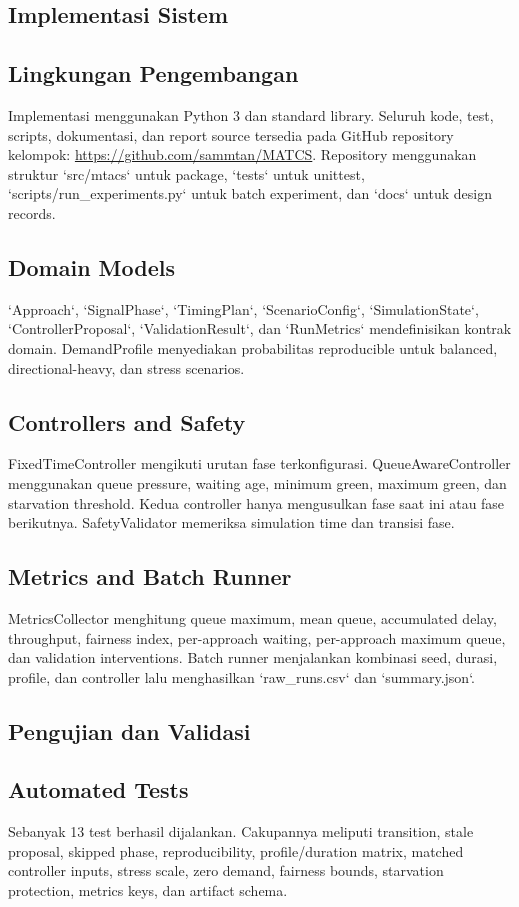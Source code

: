 \documentclass[12pt]{article}
\begin{document}
\subsection{Implementasi Sistem}
\subsection{Lingkungan Pengembangan}
Implementasi menggunakan Python 3 dan standard library. Seluruh kode, test, scripts, dokumentasi, dan report source tersedia pada GitHub repository kelompok: \url{https://github.com/sammtan/MATCS}. Repository menggunakan struktur `src/mtacs` untuk package, `tests` untuk unittest, `scripts/run\_experiments.py` untuk batch experiment, dan `docs` untuk design records.

\subsection{Domain Models}
`Approach`, `SignalPhase`, `TimingPlan`, `ScenarioConfig`, `SimulationState`, `ControllerProposal`, `ValidationResult`, dan `RunMetrics` mendefinisikan kontrak domain. DemandProfile menyediakan probabilitas reproducible untuk balanced, directional-heavy, dan stress scenarios.

\subsection{Controllers and Safety}
FixedTimeController mengikuti urutan fase terkonfigurasi. QueueAwareController menggunakan queue pressure, waiting age, minimum green, maximum green, dan starvation threshold. Kedua controller hanya mengusulkan fase saat ini atau fase berikutnya. SafetyValidator memeriksa simulation time dan transisi fase.

\subsection{Metrics and Batch Runner}
MetricsCollector menghitung queue maximum, mean queue, accumulated delay, throughput, fairness index, per-approach waiting, per-approach maximum queue, dan validation interventions. Batch runner menjalankan kombinasi seed, durasi, profile, dan controller lalu menghasilkan `raw\_runs.csv` dan `summary.json`.

\subsection{Pengujian dan Validasi}
\subsection{Automated Tests}
Sebanyak 13 test berhasil dijalankan. Cakupannya meliputi transition, stale proposal, skipped phase, reproducibility, profile/duration matrix, matched controller inputs, stress scale, zero demand, fairness bounds, starvation protection, metrics keys, dan artifact schema.
\end{document}

